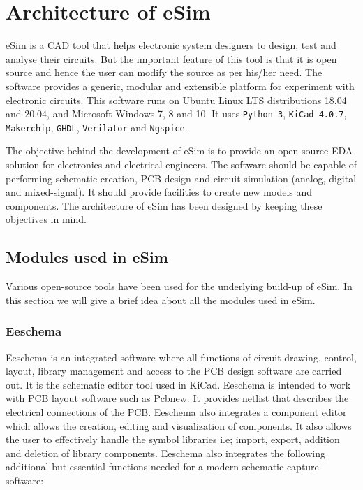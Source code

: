 
\chapter {Architecture of eSim}
\thispagestyle{empty}
\label{chap2}

eSim is a CAD  tool that helps electronic system designers
to design, test and analyse their circuits. But the important feature
of this tool is that it is open source and hence the user can modify
the source as per his/her need. The software provides a generic,
modular and extensible platform for experiment with electronic
circuits. This software runs on Ubuntu Linux LTS distributions 18.04 and 20.04, and  Microsoft Windows 7, 8 and 10.
It uses {\tt Python 3}, {\tt KiCad 4.0.7}, {\tt Makerchip},
{\tt GHDL}, {\tt Verilator} and {\tt Ngspice}.

The objective behind the development of eSim is to provide an open
source EDA solution for electronics and electrical engineers. The 
software should be capable of performing schematic creation, PCB 
design and circuit simulation (analog, digital and mixed-signal). 
It should provide facilities to create new models and components. 
The architecture of eSim has been designed by keeping these 
objectives in mind. 

\section {Modules used in eSim}
Various open-source tools have been used for the underlying build-up 
of eSim. In this section we will give a brief idea about all the modules 
used in eSim. 

\subsection {Eeschema}  
Eeschema is an integrated software where all functions of circuit
drawing, control, layout, library management and access to the PCB
design software are carried out.  It is the schematic
editor tool used in KiCad. %
Eeschema is intended to
work with PCB layout software such as Pcbnew. It provides netlist that
describes the electrical connections of the PCB. Eeschema also
integrates a component editor which allows the creation, editing and
visualization of components. It also allows the user to effectively
handle the symbol libraries i.e; import, export, addition and deletion
of library components.  Eeschema also integrates the following
additional but essential functions needed for a modern schematic
capture software:

